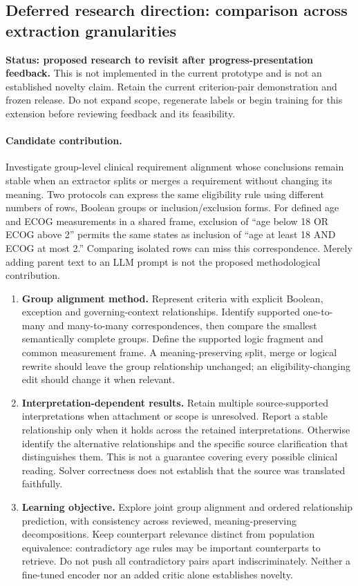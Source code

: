 \documentclass[10pt,letterpaper]{article}
\begin{document}
\subsection{Deferred research direction: comparison across extraction granularities}
\label{sec:deferrednovelty}
\textbf{Status: proposed research to revisit after progress-presentation feedback.}
This is not implemented in the current prototype and is not an established
novelty claim. Retain the current criterion-pair demonstration and frozen
release. Do not expand scope, regenerate labels or begin training for this
extension before reviewing feedback and its feasibility.

\paragraph{Candidate contribution.}
Investigate group-level clinical requirement alignment whose conclusions
remain stable when an extractor splits or merges a requirement without
changing its meaning. Two protocols can express the same eligibility rule
using different numbers of rows, Boolean groups or inclusion/exclusion forms.
For defined age and ECOG measurements in a shared frame, exclusion of
``age below 18 OR ECOG above 2'' permits the same states as inclusion of
``age at least 18 AND ECOG at most 2.'' Comparing isolated rows can miss this
correspondence. Merely adding parent text to an LLM prompt is not the proposed
methodological contribution.

\begin{enumerate}
\item \textbf{Group alignment method.} Represent criteria with explicit
Boolean, exception and governing-context relationships. Identify supported
one-to-many and many-to-many correspondences, then compare the smallest
semantically complete groups. Define the supported logic fragment and common
measurement frame. A meaning-preserving split, merge or logical rewrite should
leave the group relationship unchanged; an eligibility-changing edit should
change it when relevant.
\item \textbf{Interpretation-dependent results.} Retain multiple
source-supported interpretations when attachment or scope is unresolved.
Report a stable relationship only when it holds across the retained
interpretations. Otherwise identify the alternative relationships and the
specific source clarification that distinguishes them. This is not a guarantee
covering every possible clinical reading. Solver correctness does not establish
that the source was translated faithfully.
\item \textbf{Learning objective.} Explore joint group alignment and ordered
relationship prediction, with consistency across reviewed, meaning-preserving
decompositions. Keep counterpart relevance distinct from population equivalence:
contradictory age rules may be important counterparts to retrieve. Do not push
all contradictory pairs apart indiscriminately. Neither a fine-tuned encoder
nor an added critic alone establishes novelty.
\end{enumerate}
\end{document}
